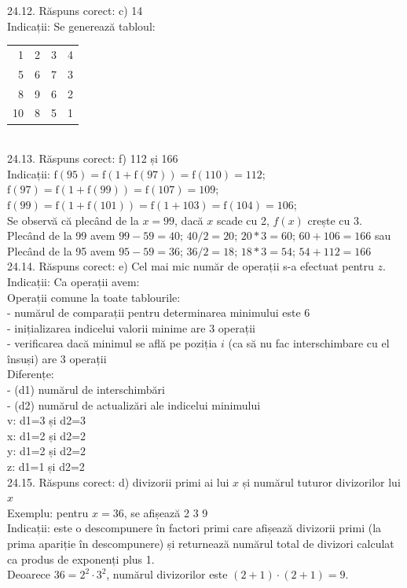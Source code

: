 24.12. Răspuns corect: c) 14\\
Indicații: Se generează tabloul:\\ \begin{tabular}{rrrr} 1 & 2 & 3 & 4 \\ 5 & 6 & 7 & 3 \\ 8 & 9 & 6 & 2 \\ 10 & 8 & 5 & 1 \end{tabular}\\

24.13. Răspuns corect: f) 112 și 166\\
Indicații: $\mathrm{f}(95)=\mathrm{f}(1+\mathrm{f}(97))=\mathrm{f}(110)=112$;\\ $\mathrm{f}(97)=\mathrm{f}(1+\mathrm{f}(99))=\mathrm{f}(107)=109$;\\ $\mathrm{f}(99)=\mathrm{f}(1+\mathrm{f}(101))=\mathrm{f}(1+103)=\mathrm{f}(104)=106$;\\ Se observă că plecând de la $x=99$, dacă $x$ scade cu 2, $f(x)$ crește cu 3.\\ Plecând de la 99 avem $99-59=40$; $40 / 2=20$; $20 * 3=60$; $60+106=166$ sau\\ Plecând de la 95 avem $95-59=36$; $36 / 2=18$; $18 * 3=54$; $54+112=166$\\

24.14. Răspuns corect: e) Cel mai mic număr de operații s-a efectuat pentru $z$.\\
Indicații: Ca operații avem:\\ Operații comune la toate tablourile:\\ - numărul de comparații pentru determinarea minimului este 6\\ - inițializarea indicelui valorii minime are 3 operații\\ - verificarea dacă minimul se află pe poziția $i$ (ca să nu fac interschimbare cu el însuși) are 3 operații\\ Diferențe:\\ - (d1) numărul de interschimbări\\ - (d2) numărul de actualizări ale indicelui minimului\\ v: d1=3 și d2=3\\ x: d1=2 și d2=2\\ y: d1=2 și d2=2\\ z: d1=1 și d2=2\\

24.15. Răspuns corect: d) divizorii primi ai lui $x$ și numărul tuturor divizorilor lui $x$\\
Exemplu: pentru $x=36$, se afișează 2 3 9\\ Indicații: este o descompunere în factori primi care afișează divizorii primi (la prima apariție în descompunere) și returnează numărul total de divizori calculat ca produs de exponenți plus 1.\\ Deoarece $36=2^{2} \cdot 3^{2}$, numărul divizorilor este $(2+1) \cdot(2+1)=9$.\\

